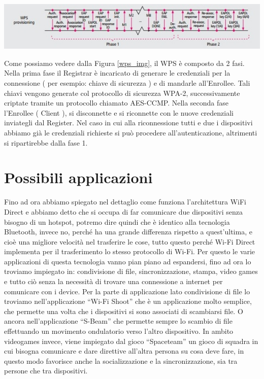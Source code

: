 \begin{center}
\includegraphics[width=1\textwidth]{imgs/WPS.jpg}
\label{wps_img}%
\end{center}

Come possiamo vedere dalla Figura \ref{wps_img}, il WPS è composto da 2 fasi.
Nella prima fase il Registrar è incaricato di generare le credenziali per la connessione (  per esempio: chiave di sicurezza ) e di mandarle all’Enrollee.
Tali chiavi vengono generate col protocollo di sicurezza WPA-2, successivamente criptate tramite un protocollo chiamato AES-CCMP.
Nella seconda fase l’Enrollee ( Client ), si disconnette e si riconnette con le nuove credenziali inviategli dal Register.
Nel caso in cui alla riconnessione tutti e due i dispositivi abbiamo già le credenziali richieste si può procedere all’autenticazione, altrimenti si ripartirebbe dalla fase 1.



\section{Possibili applicazioni}

Fino ad ora abbiamo spiegato nel dettaglio come funziona l’architettura WiFi Direct e abbiamo detto che si occupa di far comunicare due dispositivi senza bisogno di un hotspot, potremo dire quindi che è identico alla tecnologia Bluetooth, invece no, perché ha una grande differenza rispetto a quest’ultima, e cioè una migliore velocità nel trasferire le cose, tutto questo perché Wi-Fi Direct implementa per il trasferimento lo stesso protocollo di Wi-Fi.
Per questo le varie applicazioni di questa tecnologia vanno pian piano ad espandersi, fino ad ora lo troviamo impiegato in: 
condivisione di file, sincronizzazione, stampa, video games e tutto ciò senza la necessità di trovare una connessione a internet per comunicare con i device.
Per la parte di applicazione lato condivisione di file lo troviamo nell’applicazione “Wi-Fi Shoot” che è un applicazione molto semplice, che permette una volta che i dispositivi si sono associati di scambiarsi file.
O ancora nell’applicazione “S-Beam” che permette sempre lo scambio di file effettuando un movimento ondulatorio verso l’altro dispositivo.
In ambito videogames invece, viene impiegato dal gioco “Spaceteam” un gioco di squadra in cui bisogna comunicare e dare direttive all’altra persona su cosa deve fare, in questo modo favorisce anche la socializzazione e la sincronizzazione, sia tra persone che tra dispositivi.


\clearpage{\pagestyle{empty}\cleardoublepage}